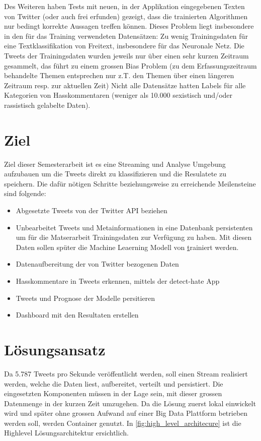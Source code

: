 Des Weiteren haben Tests mit neuen, in der Applikation eingegebenen Texten von Twitter (oder auch frei erfunden) gezeigt, dass die trainierten Algorithmen nur bedingt korrekte Aussagen treffen k{\"o}nnen. Dieses Problem liegt insbesondere in den f{\"u}r das Training verwendeten Datens{\"a}tzen:
Zu wenig Trainingsdaten f{\"u}r eine Textklassifikation von Freitext, insbesondere f{\"u}r das Neuronale Netz. Die Tweets der Trainingsdaten wurden jeweils nur {\"u}ber einen sehr kurzen Zeitraum gesammelt, das f{\"u}hrt zu einem grossen Bias Problem (zu dem Erfassungszeitraum behandelte Themen entsprechen nur z.T. den Themen {\"u}ber einen l{\"a}ngeren Zeitraum resp. zur aktuellen Zeit)
Nicht alle Datens{\"a}tze hatten Labels f{\"u}r alle Kategorien von Hasskommentaren (weniger als 10.000 sexistisch und/oder rassistisch gelabelte Daten).

\section{Ziel}
\label{sec:ziel}
Ziel dieser Semesterarbeit ist es eine Streaming und Analyse Umgebung aufzubauen um die Tweets direkt zu klassifizieren und die Resulatete zu speichern. Die daf{\"u}r n{\"o}tigen Schritte beziehungsweise zu erreichende Meilensteine sind folgende:
\begin{itemize}
\item Abgesetzte Tweets von der Twitter API beziehen
\item Unbearbeitet Tweets und Metainformationen in eine Datenbank persistenten um f{\"u}r die Matserarbeit Trainingsdaten zur Verf{\"u}gung zu haben. Mit diesen Daten sollen sp{\"u}ter die Machine Leaerning Modell von  \href{http://www.detect-hate.com} trainiert werden.  
\item Datenaufbereitung der von Twitter bezogenen Daten
\item Hasskommentare in Tweets erkennen, mittels der detect-hate App
\item Tweets und Prognose der Modelle persitieren
\item Dashboard mit den Resultaten erstellen
\end{itemize}

\section{L{\"o}sungsansatz}
\label{sec:introduction_solution}
Da 5.787 Tweets pro Sekunde ver{\"o}ffentlicht werden, soll einen Stream realisiert werden, welche die Daten liest, aufbereitet, verteilt und persistiert. Die eingesetzten Komponenten m{\"u}ssen in der Lage sein, mit dieser grossen Datenmenge in der kurzen Zeit umzugehen. Da die L{\"o}sung zuerst lokal einwickelt wird und sp{\"a}ter ohne grossen Aufwand auf einer Big Data Plattform betrieben werden soll, werden Container genutzt. In \ref{fig:high_level_architecure} ist die Highlevel L{\"o}sungsarchitektur ersichtlich. 

